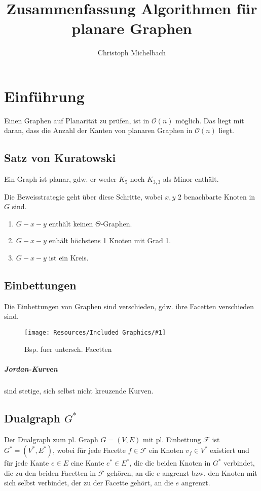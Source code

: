 \documentclass[a4paper,11pt]{report}
\title{Zusammenfassung Algorithmen für planare Graphen}
\author{Christoph Michelbach}
\newcommand{\fig}[2]{
    \begin{figure}[h]
        \begin{center}
            \texttt{[image: Resources/Included Graphics/\#1]}
            \caption{#1}
            \label{fig:#1}
        \end{center}
    \end{figure}
}
\begin{document}
\maketitle
\tableofcontents

\chapter{Einführung}
Einen Graphen auf Planarität zu prüfen, ist in $\mathcal{O}(n)$ möglich. Das liegt mit daran, dass die Anzahl der Kanten von planaren Graphen in $\mathcal{O}(n)$ liegt.

\section{Satz von Kuratowski}
Ein Graph ist planar, gdw. er weder $K_5$ noch $K_{3, 3}$ als Minor enthält.

Die Beweisstrategie geht über diese Schritte, wobei $x, y$ 2 benachbarte Knoten in $G$ sind.
\begin{enumerate}
    \item $G - x - y$ enthält keinen $\Theta$-Graphen.
    \item $G - x - y$ enhält höchstens 1 Knoten mit Grad 1.
    \item $G - x - y$ ist ein Kreis.
\end{enumerate}

\section{Einbettungen}
Die Einbettungen von Graphen sind verschieden, gdw. ihre Facetten verschieden sind.
\fig{Bsp. fuer untersch. Facetten}{.7}

\paragraph{Jordan-Kurven} sind stetige, sich selbst nicht kreuzende Kurven.


\section{Dualgraph $G^*$}
Der Dualgraph zum pl. Graph $G = (V, E)$ mit pl. Einbettung $\mathcal{F}$ ist $G^* = (V^*, E^*)$, wobei für jede Facette $f \in \mathcal{F}$ ein Knoten $v_f \in V^*$ existiert und für jede Kante $e \in E$ eine Kante $e^* \in E^*$, die die beiden Knoten in $G^*$ verbindet, die zu den beiden Facetten in $\mathcal{F}$ gehören, an die $e$ angrenzt bzw. den Knoten mit sich selbst verbindet, der zu der Facette gehört, an die $e$ angrenzt.\\
\end{document}
